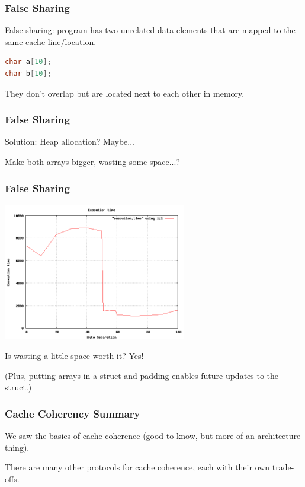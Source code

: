 \begin{frame}[fragile]
\frametitle{False Sharing}

False sharing: program has two unrelated data elements that are mapped to the same cache line/location.

\begin{lstlisting}[language=C]
char a[10];
char b[10];
\end{lstlisting}

They don't overlap but are located next to each other in memory.

\end{frame}


\begin{frame}
\frametitle{False Sharing}

Solution: Heap allocation? Maybe... 

Make both arrays bigger, wasting some space...?

\end{frame}


\begin{frame}
\frametitle{False Sharing}

\begin{center}
\includegraphics[width=0.6\textwidth]{images/falsesharing.png}
\end{center}

Is wasting a little space worth it? Yes!

(Plus, putting arrays in a struct
and padding enables future updates to the struct.)
\end{frame}

\begin{frame}
  \frametitle{Cache Coherency Summary}
\Large
  
We saw the basics of cache coherence (good to know, but more of an architecture
      thing).
      
There are many other protocols for cache coherence, each with their own
      trade-offs.\\[1em]


  
\end{frame}



